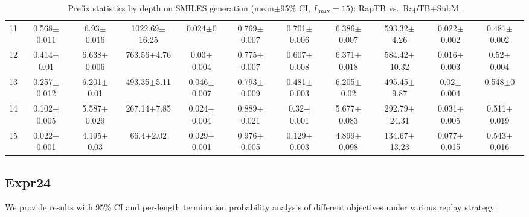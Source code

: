\documentclass{article}
\theoremstyle{plain}
\theoremstyle{definition}
\theoremstyle{remark}
\begin{document}
\begin{table}[!htbp]
{\begin{tabular}{ccccccccccc}
11 & 0.568$\pm$0.011 & 6.93$\pm$0.016 & 1022.69$\pm$16.25 & 0.024$\pm$0 & 0.769$\pm$0.007
   & 0.701$\pm$0.006 & 6.386$\pm$0.007 & 593.32$\pm$4.26 & 0.022$\pm$0.002 & 0.481$\pm$0.002 \\
12 & 0.414$\pm$0.01 & 6.638$\pm$0.006 & 763.56$\pm$4.76 & 0.03$\pm$0.004 & 0.775$\pm$0.007
   & 0.607$\pm$0.008 & 6.371$\pm$0.018 & 584.42$\pm$10.32 & 0.016$\pm$0.003 & 0.52$\pm$0.004 \\
13 & 0.257$\pm$0.012 & 6.201$\pm$0.01 & 493.35$\pm$5.11 & 0.046$\pm$0.007 & 0.793$\pm$0.009
   & 0.481$\pm$0.003 & 6.205$\pm$0.02 & 495.45$\pm$9.87 & 0.02$\pm$0.004 & 0.548$\pm$0 \\
14 & 0.102$\pm$0.005 & 5.587$\pm$0.029 & 267.14$\pm$7.85 & 0.024$\pm$0.004 & 0.889$\pm$0.021
   & 0.32$\pm$0.001 & 5.677$\pm$0.083 & 292.79$\pm$24.31 & 0.031$\pm$0.005 & 0.511$\pm$0.019 \\
15 & 0.022$\pm$0.001 & 4.195$\pm$0.03 & 66.4$\pm$2.02 & 0.029$\pm$0.001 & 0.976$\pm$0.005
   & 0.129$\pm$0.003 & 4.899$\pm$0.098 & 134.67$\pm$13.23 & 0.077$\pm$0.015 & 0.543$\pm$0.016 \\
\bottomrule
\end{tabular}
}%
\caption{Prefix statistics by depth on SMILES generation (mean$\pm$95\% CI, $L_{\max}=15$): RapTB vs.\ RapTB+SubM.}
\label{tab:smiles_L15_prefix_raptb}
\end{table}


\subsection{Expr24}
\label{app:results_expr24}
We provide results with 95\% CI and per-length termination probability analysis of different objectives under various replay strategy.
\end{document}
